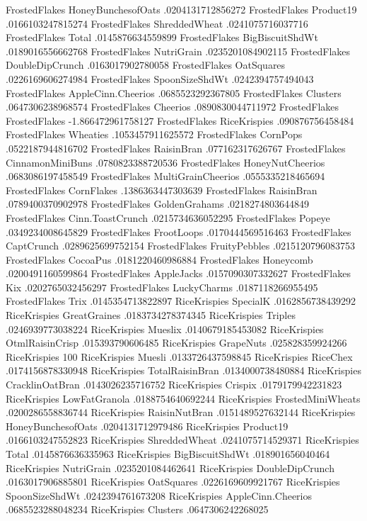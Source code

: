 FrostedFlakes	HoneyBunchesofOats	.0204131712856272
FrostedFlakes	Product19	.0166103247815274
FrostedFlakes	ShreddedWheat	.0241075716037716
FrostedFlakes	Total	.0145876634559899
FrostedFlakes	BigBiscuitShdWt	.0189016556662768
FrostedFlakes	NutriGrain	.0235201084902115
FrostedFlakes	DoubleDipCrunch	.0163017902780058
FrostedFlakes	OatSquares	.0226169606274984
FrostedFlakes	SpoonSizeShdWt	.0242394757494043
FrostedFlakes	AppleCinn.Cheerios	.0685523292367805
FrostedFlakes	Clusters	.0647306238968574
FrostedFlakes	Cheerios	.0890830044711972
FrostedFlakes	FrostedFlakes	-1.866472961758127
FrostedFlakes	RiceKrispies	.090876756458484
FrostedFlakes	Wheaties	.1053457911625572
FrostedFlakes	CornPops	.0522187944816702
FrostedFlakes	RaisinBran	.077162317626767
FrostedFlakes	CinnamonMiniBuns	.0780823388720536
FrostedFlakes	HoneyNutCheerios	.0683086197458549
FrostedFlakes	MultiGrainCheerios	.0555335218465694
FrostedFlakes	CornFlakes	.1386363447303639
FrostedFlakes	RaisinBran	.0789400370902978
FrostedFlakes	GoldenGrahams	.0218274803644849
FrostedFlakes	Cinn.ToastCrunch	.0215734636052295
FrostedFlakes	Popeye	.0349234008645829
FrostedFlakes	FrootLoops	.0170444569516463
FrostedFlakes	CaptCrunch	.0289625699752154
FrostedFlakes	FruityPebbles	.0215120796083753
FrostedFlakes	CocoaPus	.0181220460986884
FrostedFlakes	Honeycomb	.0200491160599864
FrostedFlakes	AppleJacks	.0157090307332627
FrostedFlakes	Kix	.0202765032456297
FrostedFlakes	LuckyCharms	.0187118266955495
FrostedFlakes	Trix	.0145354713822897
RiceKrispies	SpecialK	.0162856738439292
RiceKrispies	GreatGraines	.0183734278374345
RiceKrispies	Triples	.0246939773038224
RiceKrispies	Mueslix	.0140679185453082
RiceKrispies	OtmlRaisinCrisp	.015393790606485
RiceKrispies	GrapeNuts	.025828359924266
RiceKrispies	100%
RiceKrispies	Muesli	.0133726437598845
RiceKrispies	RiceChex	.0174156878330948
RiceKrispies	TotalRaisinBran	.0134000738480884
RiceKrispies	CracklinOatBran	.0143026235716752
RiceKrispies	Crispix	.0179179942231823
RiceKrispies	LowFatGranola	.0188754640692244
RiceKrispies	FrostedMiniWheats	.0200286558836744
RiceKrispies	RaisinNutBran	.0151489527632144
RiceKrispies	HoneyBunchesofOats	.0204131712979486
RiceKrispies	Product19	.0166103247552823
RiceKrispies	ShreddedWheat	.0241075714529371
RiceKrispies	Total	.0145876636335963
RiceKrispies	BigBiscuitShdWt	.018901656040464
RiceKrispies	NutriGrain	.0235201084462641
RiceKrispies	DoubleDipCrunch	.0163017906885801
RiceKrispies	OatSquares	.0226169609921767
RiceKrispies	SpoonSizeShdWt	.0242394761673208
RiceKrispies	AppleCinn.Cheerios	.0685523288048234
RiceKrispies	Clusters	.0647306242268025
